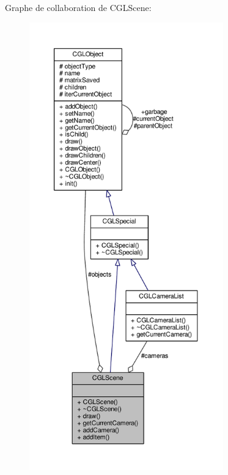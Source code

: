 Graphe de collaboration de C\-G\-L\-Scene\-:\nopagebreak
\begin{figure}[H]
\begin{center}
\leavevmode
\includegraphics[height=550pt]{d1/ddc/class_c_g_l_scene__coll__graph}
\end{center}
\end{figure}
